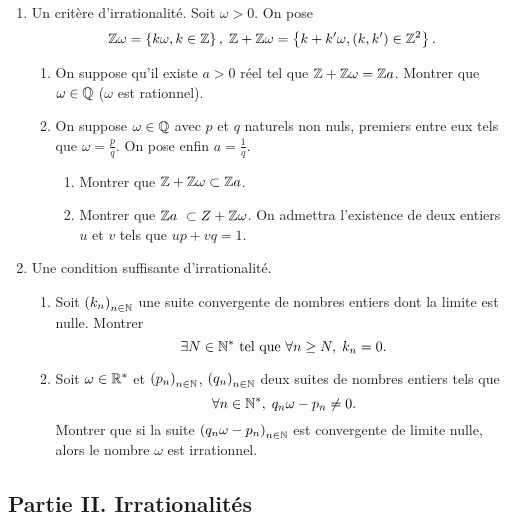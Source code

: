 \begin{enumerate}
 \item Un critère d'irrationalité.\newline
 Soit $\omega > 0$. On pose
 \[
  \mathbb{Z} \omega = \left\lbrace k \omega, k \in \mathbb{Z} \right\rbrace,\; 
  \mathbb{Z} + \mathbb{Z} \omega = \left\lbrace k + k' \omega, (k,k') \in \mathbb{Z}^2 \right\rbrace.
 \]
\begin{enumerate}
 \item On suppose qu'il existe $a>0$ réel tel que $\mathbb{Z} + \mathbb{Z} \omega = \mathbb{Z} a$. Montrer que $\omega \in \mathbb{Q}$ ($\omega$ est rationnel).
 \item On suppose $\omega \in \mathbb{Q}$ avec $p$ et $q$ naturels non nuls, premiers entre eux tels que $\omega = \frac{p}{q}$. On pose enfin $a = \frac{1}{q}$.
 \begin{enumerate}
  \item Montrer que $\mathbb{Z} + \mathbb{Z} \omega \subset \mathbb{Z} a$.
  \item Montrer que $\mathbb{Z} a\ \subset Z + \mathbb{Z} \omega$. On admettra l'existence de deux entiers $u$ et $v$ tels que $up + vq = 1$.
 \end{enumerate}
\end{enumerate}

 \item Une condition suffisante d'irrationalité.
 \begin{enumerate}
  \item Soit $\left( k_n \right)_{n \in \mathbb{N}}$ une suite convergente de nombres entiers dont la limite est nulle. Montrer
  \[
   \exists N \in \mathbb{N}^* \text{ tel que } \forall n \geq N, \; k_n = 0.
  \]
  \item Soit $\omega \in \mathbb{R}^*$ et $\left( p_n \right)_{n \in \mathbb{N}}$, $\left( q_n \right)_{n \in \mathbb{N}}$ deux suites de nombres entiers tels que 
  \[
   \forall n \in \mathbb{N}^*, \; q_n \omega - p_n \neq 0.
  \]
Montrer que si la suite $\left( q_n \omega - p_n \right)_{n \in \mathbb{N}}$ est convergente de limite nulle, alors le nombre $\omega$ est irrationnel.
 \end{enumerate}
\end{enumerate}

\subsection*{Partie II. Irrationalités}

